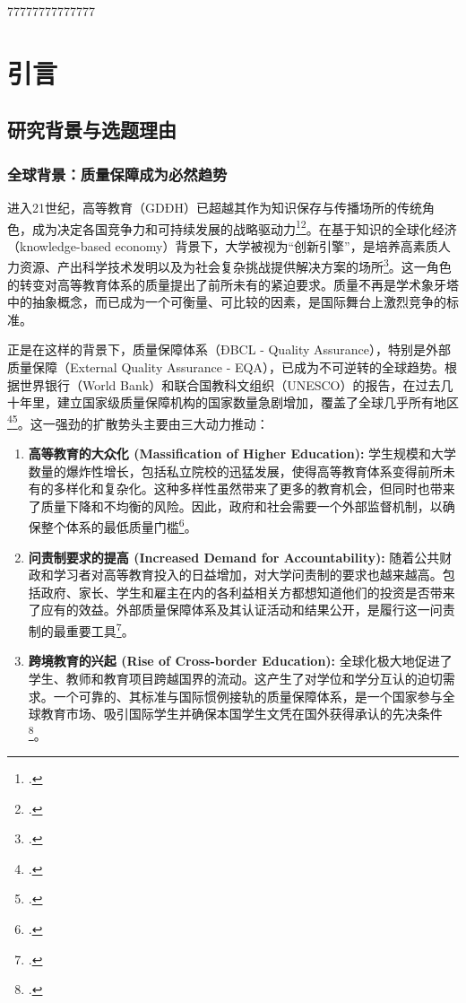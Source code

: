 77777777777777
\chapter{引言}
\label{chap:gioi_thieu}

\section{研究背景与选题理由}
\label{sec:boi_canh_ly_do}

\subsection{全球背景：质量保障成为必然趋势}

进入21世纪，高等教育（GDĐH）已超越其作为知识保存与传播场所的传统角色，成为决定各国竞争力和可持续发展的战略驱动力\footcite{Altbach2001}\footcite{WB_KnowledgeEconomy}。在基于知识的全球化经济（knowledge-based economy）背景下，大学被视为“创新引擎”，是培养高素质人力资源、产出科学技术发明以及为社会复杂挑战提供解决方案的场所\footcite{OECD_HE2008}。这一角色的转变对高等教育体系的质量提出了前所未有的紧迫要求。质量不再是学术象牙塔中的抽象概念，而已成为一个可衡量、可比较的因素，是国际舞台上激烈竞争的标准。

正是在这样的背景下，质量保障体系（ĐBCL - Quality Assurance），特别是外部质量保障（External Quality Assurance - EQA），已成为不可逆转的全球趋势。根据世界银行（World Bank）和联合国教科文组织（UNESCO）的报告，在过去几十年里，建立国家级质量保障机构的国家数量急剧增加，覆盖了全球几乎所有地区\footcite{WorldBank_QA_GlobalTrends}\footcite{UNESCO_QA2018}。这一强劲的扩散势头主要由三大动力推动：

\begin{enumerate}
    \item \textbf{高等教育的大众化 (Massification of Higher Education):} 学生规模和大学数量的爆炸性增长，包括私立院校的迅猛发展，使得高等教育体系变得前所未有的多样化和复杂化。这种多样性虽然带来了更多的教育机会，但同时也带来了质量下降和不均衡的风险。因此，政府和社会需要一个外部监督机制，以确保整个体系的最低质量门槛\footcite{Trow2007}。
    
    \item \textbf{问责制要求的提高 (Increased Demand for Accountability):} 随着公共财政和学习者对高等教育投入的日益增加，对大学问责制的要求也越来越高。包括政府、家长、学生和雇主在内的各利益相关方都想知道他们的投资是否带来了应有的效益。外部质量保障体系及其认证活动和结果公开，是履行这一问责制的最重要工具\footcite{Harvey2005}。
    
    \item \textbf{跨境教育的兴起 (Rise of Cross-border Education):} 全球化极大地促进了学生、教师和教育项目跨越国界的流动。这产生了对学位和学分互认的迫切需求。一个可靠的、其标准与国际惯例接轨的质量保障体系，是一个国家参与全球教育市场、吸引国际学生并确保本国学生文凭在国外获得承认的先决条件\footcite{Knight2006}。
\end{enumerate}

